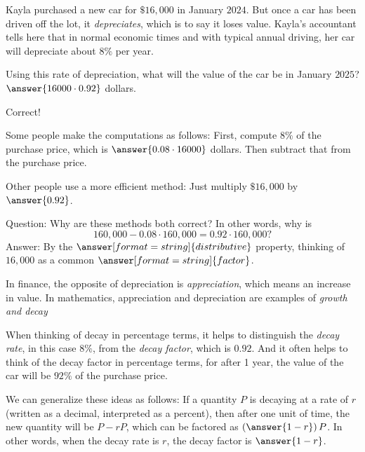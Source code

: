 \documentclass[nooutcomes]{ximera}
\begin{document}
\begin{problem}
Kayla purchased a new car for $\$16,\!000$ in January $2024$.  But once a car has been driven off the lot, it \emph{depreciates}, which is to say it loses value.  Kayla's accountant tells here that in normal economic times and with typical annual driving, her car will depreciate about $8\%$ per year.  

Using this rate of depreciation, what will the value of the car be in January $2025$?  $\answer{16000\cdot 0.92}$ dollars.  
\begin{problem}
Correct!  

Some people make the computations as follows:  First, compute $8\%$ of the purchase price, which is $\answer{0.08\cdot 16000}$ dollars.  Then subtract that from the purchase price.  

Other people use a more efficient method:  Just multiply $\$16,\!000$ by $\answer{0.92}$.  

\begin{problem}
Question: Why are these methods both correct?  In other words, why is  
\[
160,\!000 - 0.08\cdot 160,\!000 = 0.92 \cdot 160,\!000?  
\]
Answer: By the $\answer[format=string]{distributive}$ property, thinking of $16,\!000$ as a common $\answer[format=string]{factor}$. 

\begin{problem}
In finance, the opposite of depreciation is \emph{appreciation}, which means an increase in value.  In mathematics, appreciation and depreciation are examples of \emph{growth and decay}
 
When thinking of decay in percentage terms, it helps to distinguish the \emph{decay rate}, in this case $8\%$, from the 
\emph{decay factor}, which is $0.92$.  And it often helps to think of the decay factor in percentage terms, for after 1 year, 
the value of the car will be $92\%$ of the purchase price.  

We can generalize these ideas as follows:  If a quantity $P$ is decaying at a rate of $r$ (written as a decimal, interpreted as a percent), then after one unit of time, the 
new quantity will be $P - rP$, which can be factored as $\left(\answer{1-r}\right)P$.  In other words, when the decay rate is $r$, the decay factor is $\answer{1-r}$.  

\end{problem}
\end{problem}
\end{problem}
\end{problem}
\end{document}
